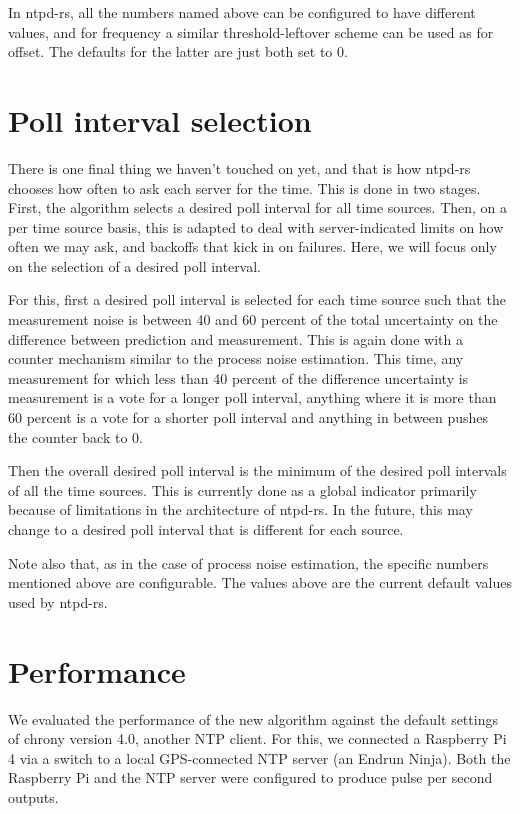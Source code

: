 \documentclass{article}
\begin{document}
In ntpd-rs, all the numbers named above can be configured to have different values, and for frequency a similar threshold-leftover scheme can be used as for offset.
The defaults for the latter are just both set to 0.

\section{Poll interval selection}

There is one final thing we haven't touched on yet, and that is how ntpd-rs chooses how often to ask each server for the time. This is done in two stages. First, the algorithm selects a desired poll interval for all time sources. Then, on a per time source basis, this is adapted to deal with server-indicated limits on how often we may ask, and backoffs that kick in on failures. Here, we will focus only on the selection of a desired poll interval.

For this, first a desired poll interval is selected for each time source such that the measurement noise is between 40 and 60 percent of the total uncertainty on the difference between prediction and measurement. This is again done with a counter mechanism similar to the process noise estimation. This time, any measurement for which less than 40 percent of the difference uncertainty is measurement is a vote for a longer poll interval, anything where it is more than 60 percent is a vote for a shorter poll interval and anything in between pushes the counter back to 0.

Then the overall desired poll interval is the minimum of the desired poll intervals of all the time sources. This is currently done as a global indicator primarily because of limitations in the architecture of ntpd-rs. In the future, this may change to a desired poll interval that is different for each source.

Note also that, as in the case of process noise estimation, the specific numbers mentioned above are configurable. The values above are the current default values used by ntpd-rs.

\section{Performance}

We evaluated the performance of the new algorithm against the default settings of chrony version 4.0, another NTP client. For this, we connected a Raspberry Pi 4 via a switch to a local GPS-connected NTP server (an Endrun Ninja). Both the Raspberry Pi and the NTP server were configured to produce pulse per second outputs.
\end{document}
